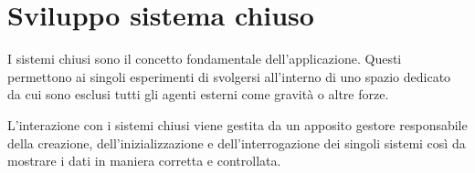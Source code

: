 \section{Sviluppo sistema chiuso}
\label{sec:sistema-chiuso}

I sistemi chiusi sono il concetto fondamentale dell'applicazione. Questi
permettono ai singoli esperimenti di svolgersi all'interno di uno spazio
dedicato da cui sono esclusi tutti gli agenti esterni come gravità o altre forze.

L'interazione con i sistemi chiusi viene gestita da un apposito gestore
responsabile della creazione, dell'inizializzazione e dell'interrogazione dei singoli
sistemi così da mostrare i dati in maniera corretta e controllata.